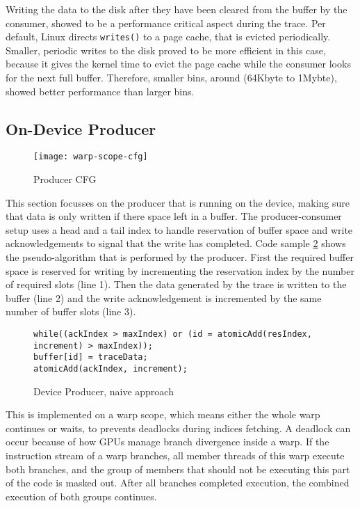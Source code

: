 	Writing the data to the disk after they have been cleared from the buffer by the consumer, showed to be a performance critical aspect during the trace. Per default, Linux directs \verb|writes()| to a page cache, that is evicted periodically. Smaller, periodic writes to the disk proved to be more efficient in this case, because it gives the kernel time to evict the page cache while the consumer looks for
	the next full buffer. Therefore, smaller bins, around (64Kbyte to 1Mybte), showed better performance than larger bins.
	
	\subsection{On-Device Producer}
\begin{figure}[t]
	\centering
	\texttt{[image: warp-scope-cfg]}
	\caption{Producer CFG}
\label{wscfg}
\end{figure}	
	This section focusses on the producer that is running on the device, making sure that data is only written if there space left
	in a buffer. The producer-consumer setup uses a head and a tail index to handle reservation of buffer space and write acknowledgements to signal that the write has completed. Code sample \ref{prod-cons} shows the pseudo-algorithm that is performed by the producer. First the required buffer space is reserved for writing by incrementing the reservation index
	by the number of required slots (line 1). Then the data generated by the trace is
	written to the buffer (line 2) and the write acknowledgement is incremented by the same number of buffer slots (line 3).
\begin{figure}
	\begin{lstlisting}[style=C]
while((ackIndex > maxIndex) or (id = atomicAdd(resIndex, increment) > maxIndex));
buffer[id] = traceData;
atomicAdd(ackIndex, increment);
\end{lstlisting}
	\caption{Device Producer, naive approach}
	\label{prod-cons}
\end{figure}

	
	This is implemented on a warp scope, which means either the whole warp continues or waits, to prevents deadlocks during indices fetching.
	A deadlock can occur because of how GPUs manage branch divergence inside a warp. If the instruction stream of a warp branches, all member threads of this warp execute both branches, and the group of members that should not be executing this part of the code is masked out. After all branches completed execution, the combined execution of both groups continues.
	
